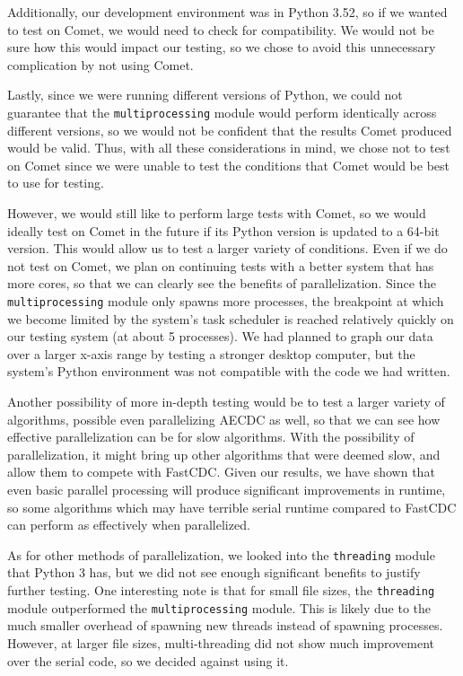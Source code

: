 \documentclass{acmtog} %
\begin{document}
	Additionally, our development environment was in Python 3.52, so if we wanted to test on Comet, we would need to check for compatibility. We would not be sure how this would impact our testing, so we chose to avoid this unnecessary complication by not using Comet.
	
	Lastly, since we were running different versions of Python, we could not guarantee that the \texttt{multiprocessing} module would perform identically across different versions, so we would not be confident that the results Comet produced would be valid. Thus, with all these considerations in mind, we chose not to test on Comet since we were unable to test the conditions that Comet would be best to use for testing.
	
	However, we would still like to perform large tests with Comet, so we would ideally test on Comet in the future if its Python version is updated to a 64-bit version. This would allow us to test a larger variety of conditions. Even if we do not test on Comet, we plan on continuing tests with a better system that has more cores, so that we can clearly see the benefits of parallelization. Since the \texttt{multiprocessing} module only spawns more processes, the breakpoint at which we become limited by the system's task scheduler is reached relatively quickly on our testing system (at about 5 processes). We had planned to graph our data over a larger x-axis range by testing a stronger desktop computer, but the system's Python environment was not compatible with the code we had written.
	
	Another possibility of more in-depth testing would be to test a larger variety of algorithms, possible even parallelizing AECDC as well, so that we can see how effective parallelization can be for slow algorithms. With the possibility of parallelization, it might bring up other algorithms that were deemed slow, and allow them to compete with FastCDC. Given our results, we have shown that even basic parallel processing will produce significant improvements in runtime, so some algorithms which may have terrible serial runtime compared to FastCDC can perform as effectively when parallelized. 
	
	As for other methods of parallelization, we looked into the \texttt{threading} module that Python 3 has, but we did not see enough significant benefits to justify further testing. One interesting note is that for small file sizes, the \texttt{threading} module outperformed the \texttt{multiprocessing} module. This is likely due to the much smaller overhead of spawning new threads instead of spawning processes. However, at larger file sizes, multi-threading did not show much improvement over the serial code, so we decided against using it. 
	
\end{document}
